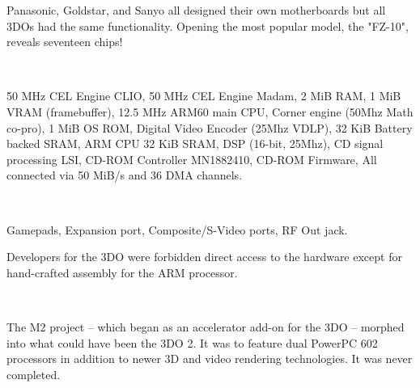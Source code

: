 \par
Panasonic, Goldstar, and Sanyo all designed their own motherboards but all 3DOs had the same functionality. Opening the most popular model, the "FZ-10", reveals seventeen chips!\\
\par
{}\\
\par
{} 50 MHz CEL Engine CLIO, 
 50 MHz CEL Engine  Madam, 
 2 MiB RAM, 
 1 MiB VRAM (framebuffer), 
 12.5 MHz ARM60 main CPU, 
 Corner engine (50Mhz Math co-pro), 
 1 MiB OS ROM, 
 Digital Video Encoder (25Mhz VDLP), 
 32 KiB Battery backed SRAM,  
 ARM CPU 32 KiB SRAM, 
 DSP (16-bit, 25Mhz), 
 CD signal processing LSI, 
 CD-ROM Controller MN1882410, 
 CD-ROM Firmware, All connected via 50 MiB/s and 36 DMA channels.\\
\par
{}\\
\par
{} Gamepads,
 Expansion port,
 Composite/S-Video ports, 
 RF Out jack. 


\par
Developers for the 3DO were forbidden direct access to the hardware except for hand-crafted assembly for the ARM processor.\\
\par
{}\\
\par
 The M2 project -- which began as an accelerator add-on for the 3DO -- morphed into what could have been the 3DO 2. It was to feature dual PowerPC 602 processors in addition to newer 3D and video rendering technologies. It was never completed.\\
\par
{}


